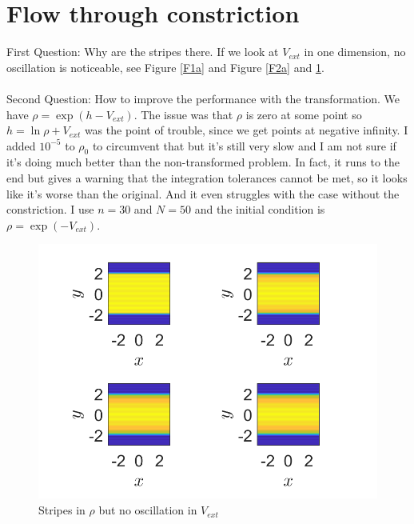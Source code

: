 \documentclass[11pt, a4paper]{article}
\theoremstyle{definition}
\begin{document}
	\section{Flow through constriction}
	First Question: Why are the stripes there. If we look at $V_{ext}$ in one dimension, no oscillation is noticeable, see Figure \ref{F1a} and Figure \ref{F2a} and \ref{F3a}.\\
	\\
	Second Question: How to improve the performance with the transformation. We have $\rho = \exp(h -V_{ext})$. The issue was that $\rho$ is zero at some point so $h = \ln \rho + V_{ext}$ was the point of trouble, since we get points at negative infinity. I added $10^{-5}$ to $\rho_0$ to circumvent that but it's still very slow and I am not sure if it's doing much better than the non-transformed problem.  In fact, it runs to the end but gives a warning that the integration tolerances cannot be met, so it looks like it's worse than the original. And it even struggles with the case without the constriction. I use $n = 30$ and $N =50$ and the initial condition is $\rho = \exp(-V_{ext})$.
	\begin{figure}[h]
		\centering
		\includegraphics[scale=0.7]{rhoT.png}
		\caption{Stripes in $\rho$ but no oscillation in $V_{ext}$} 
		\label{F3a}
	\end{figure} 
\end{document}
